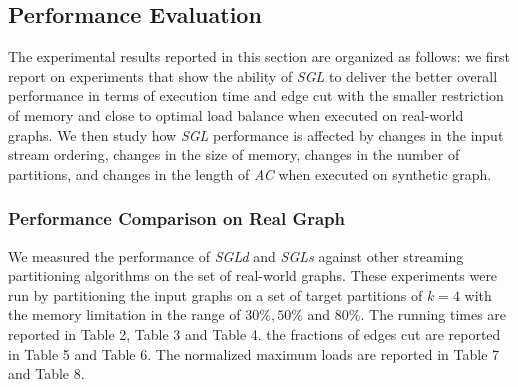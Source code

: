 \documentclass{sig-alternate-2013}
\begin{document}
\subsection{Performance Evaluation}\label{ch_experiment_result}

The experimental results reported in this section are organized as follows: we first report on experiments that show the ability of \textit{SGL} to deliver the better overall performance
in terms of execution time and edge cut with the smaller restriction of memory and close to optimal load balance when executed on real-world graphs.
We then study how \textit{SGL} performance is affected by changes in the input stream ordering, changes in the size of memory, changes in the number of partitions, and changes in the length of \textit{AC} when executed on synthetic graph.

\subsubsection{Performance Comparison on Real Graph}
We measured the performance of \textit{SGLd} and \textit{SGLs} against other streaming partitioning algorithms on the set of real-world graphs. These experiments were run by partitioning the input graphs on a set of target partitions of $k=4$ with the memory limitation in the range of $30\%, 50\%$ and $80\%$.
The running times are reported in Table 2, Table 3 and Table 4.
the fractions of edges cut are reported in Table 5 and Table 6.
The normalized maximum loads are reported in Table 7 and Table 8.
\end{document}
